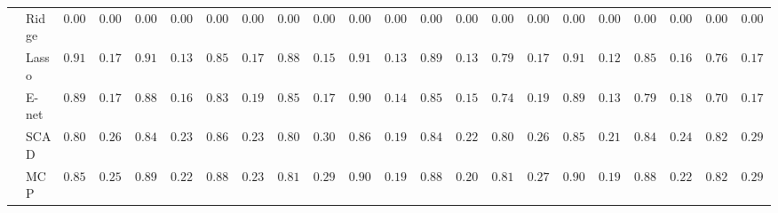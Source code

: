 \begin{tabular}{ll|ll|llllll|llllll|llllll}
 & Ridge  & $0.0000$ & $0.0000$ & $0.0000$ & $0.0000$ & $0.0000$ & $0.0000$ & $0.0000$ & $0.0000$ & $0.0000$ & $0.0000$ & $0.0000$ & $0.0000$ & $0.0000$ & $0.0000$ & $0.0000$ & $0.0000$ & $0.0000$ & $0.0000$ & $0.0000$ & $0.0000$ \\
 & Lasso  & $0.9167$ & $0.1733$ & $0.9133$ & $0.1371$ & $0.8583$ & $0.1747$ & $0.8817$ & $0.1541$ & $0.9183$ & $0.1329$ & $0.8917$ & $0.1369$ & $0.7917$ & $0.1794$ & $0.9183$ & $0.1265$ & $0.8567$ & $0.1642$ & $0.7633$ & $0.1791$ \\
 & E-net  & $0.8983$ & $0.1739$ & $0.8867$ & $0.1656$ & $0.8317$ & $0.1932$ & $0.8533$ & $0.1745$ & $0.9017$ & $0.1423$ & $0.8533$ & $0.1558$ & $0.7417$ & $0.1901$ & $0.8983$ & $0.1399$ & $0.7950$ & $0.1817$ & $0.7083$ & $0.1794$ \\
 & SCAD  & $0.8017$ & $0.2624$ & $0.8467$ & $0.2389$ & $0.8617$ & $0.2346$ & $0.8067$ & $0.3095$ & $0.8650$ & $0.1963$ & $0.8400$ & $0.2209$ & $0.8000$ & $0.2670$ & $0.8567$ & $0.2171$ & $0.8433$ & $0.2425$ & $0.8250$ & $0.2943$ \\
 & MCP  & $0.8567$ & $0.2518$ & $0.8917$ & $0.2289$ & $0.8817$ & $0.2349$ & $0.8183$ & $0.2969$ & $0.9083$ & $0.1944$ & $0.8833$ & $0.2017$ & $0.8100$ & $0.2773$ & $0.9067$ & $0.1929$ & $0.8850$ & $0.2281$ & $0.8233$ & $0.2957$ \\
\hline 
\end{tabular}

